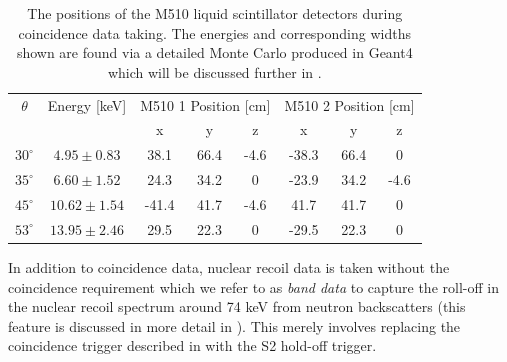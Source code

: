 \begin{table}[t]
\centering
\def\arraystretch{1.3}
\begin{tabular}{cc|ccc|ccc}
\hline
$\theta$ & Energy [keV] & \multicolumn{3}{c|}{M510 1 Position [cm]} & \multicolumn{3}{c}{M510 2 Position [cm]} \\
 & & x & y & z & x & y & z \\
\hline
$30^{\circ}$ & $4.95 \pm 0.83$ & 38.1 & 66.4 & -4.6 & -38.3 & 66.4 & 0 \\
$35^{\circ}$ & $6.60 \pm 1.52$ & 24.3 & 34.2 & 0 & -23.9 & 34.2 & -4.6 \\
$45^{\circ}$ & $10.62 \pm 1.54$ & -41.4 & 41.7 & -4.6 & 41.7 & 41.7 & 0 \\
$53^{\circ}$ & $13.95 \pm 2.46$ & 29.5 & 22.3 & 0 & -29.5 & 22.3 & 0 \\
\hline
\end{tabular}
\caption{The positions of the M510 liquid scintillator detectors during coincidence data taking.  The energies and corresponding widths shown are found via a detailed Monte Carlo produced in Geant4 which will be discussed further in .}
\label{tab:nerix_ej_positions}
\end{table}

In addition to coincidence data, nuclear recoil data is taken without the coincidence requirement which we refer to as \textit{band data} to capture the roll-off in the nuclear recoil spectrum around 74 keV from neutron backscatters (this feature is discussed in more detail in ).  This merely involves replacing the coincidence trigger described in  with the S2 hold-off trigger.

